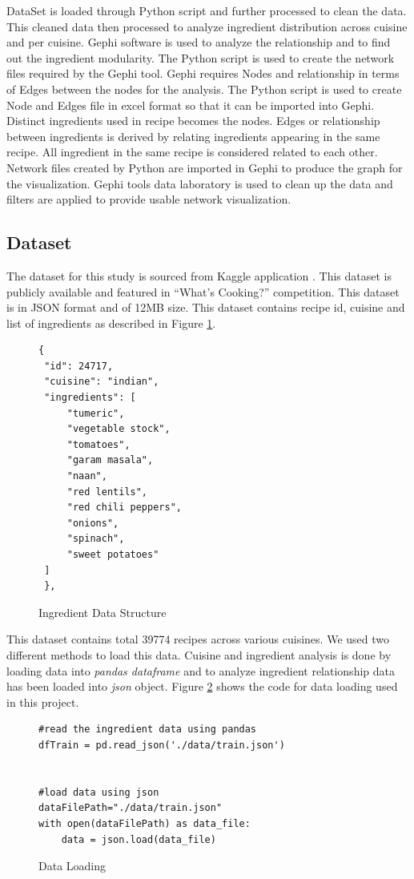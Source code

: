\documentclass[sigconf]{acmart}
\begin{document}
DataSet is loaded through Python script and further processed to clean the data. This cleaned data then processed to analyze ingredient distribution across cuisine and per cuisine. Gephi software is used to analyze the relationship and to find out the ingredient modularity. The Python script is used to create the network files required by the Gephi tool. Gephi requires Nodes and relationship in terms of Edges between the nodes for the analysis. The Python script is used to create Node and Edges file in excel format so that it can be imported into Gephi. Distinct ingredients used in recipe becomes the nodes. Edges or relationship between ingredients is derived by relating ingredients appearing in the same recipe. All ingredient in the same recipe is considered related to each other.
Network files created by Python are imported in Gephi to produce the graph for the visualization. Gephi tools data laboratory is used to clean up the data and filters are applied to provide usable network visualization. 

\subsection{Dataset}
The dataset for this study is sourced from Kaggle application \cite{www-kaggle}. This dataset is publicly available and featured in ``What's Cooking?'' competition. This dataset is in JSON format and of 12MB size. This dataset contains recipe id, cuisine and list of ingredients as described in Figure \ref{c:data-structure}.
\begin{figure}[htb]
\begin{verbatim}
{
 "id": 24717,
 "cuisine": "indian",
 "ingredients": [
     "tumeric",
     "vegetable stock",
     "tomatoes",
     "garam masala",
     "naan",
     "red lentils",
     "red chili peppers",
     "onions",
     "spinach",
     "sweet potatoes"
 ]
 },
\end{verbatim}
\caption{Ingredient Data Structure}\label{c:data-structure}
\end{figure}
This dataset contains total 39774 recipes across various cuisines. We used two different methods to load this data. Cuisine and ingredient analysis is done by loading data into \emph{pandas dataframe} and to analyze ingredient relationship data has been loaded into \emph{json} object. Figure \ref{c:data-loading} shows the code for data loading used in this project.
\begin{figure}[htb]
\begin{verbatim}
#read the ingredient data using pandas
dfTrain = pd.read_json('./data/train.json')


#load data using json
dataFilePath="./data/train.json"
with open(dataFilePath) as data_file:    
    data = json.load(data_file)
\end{verbatim}
\caption{Data Loading}\label{c:data-loading}
\end{figure}
\end{document}
